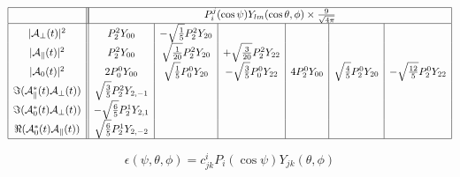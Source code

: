 \documentclass[a4paper,9pt,twoside]{article}
\begin{document}
\begin{equation}
\begin{array}{|c|| c | c | c | c | c | c |}
 \hline
&\multicolumn{6}{|c|}{ P_i^j(\cos\psi)Y_{lm}(\cos\theta,\phi) \times \frac{9}{\sqrt{4\pi}} } \\
 \hline
|{\cal A}_\perp(t)|^2                   &  P_2^2 Y_{00} & -\sqrt{\frac{1}{5}} P_2^2 Y_{20} &                                 &&& \\
|{\cal A}_\parallel(t)|^2               &  P_2^2 Y_{00} &  \sqrt{\frac{1}{20}} P_2^2 Y_{20} & +\sqrt{\frac{3}{20}} P_2^2Y_{22} & && \\
|{\cal A}_0(t)|^2                       &  2 P_0^0Y_{00}  & \sqrt{\frac{1}{5}} P_0^0 Y_{20} & -\sqrt{\frac{3}{5}} P_0^0 Y_{22}
                                        &  4 P_2^0Y_{00}  & \sqrt{\frac{4}{5}} P_2^0 Y_{20} & -\sqrt{\frac{12}{5}} P_2^0 Y_{22} \\
\Im({\cal A}_\parallel^*(t){\cal A}_\perp(t)) &  \sqrt{\frac{3}{5}} P_2^2 Y_{2,-1} &&&&&\\
\Im({\cal A}_0^*(t){\cal A}_\perp(t))         & -\sqrt{\frac{6}{5}} P_2^1 Y_{2,1} &&&&&\\
\Re({\cal A}_0^*(t){\cal A}_\parallel(t))     &  \sqrt{\frac{6}{5}} P_2^1 Y_{2,-2} &&&&&\\
 \hline
\end{array}
\end{equation}



\pagebreak
\begin{equation}
   \epsilon(\psi,\theta,\phi) = c^{i}_{jk} P_i(\cos\psi)Y_{jk}(\theta,\phi)
   \label{eq:eps_exp}
\end{equation}
\end{document}

